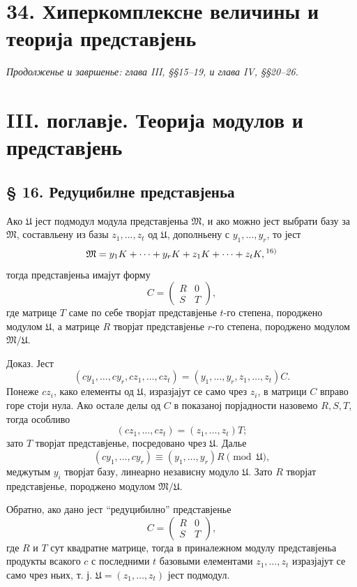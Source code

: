 ﻿\documentclass[11pt]{article}
\providecommand{\mM}{\mathfrak{M}}
\providecommand{\mU}{\mathfrak{U}}
\begin{document}
\section*{34. Хиперкомплексне величины и теорија представјень}
\emph{Продолженье и завршенье: глава III, §§15--19, и глава IV, §§20--26.}

\section*{III. поглавје. Теорија модулов и представјень}

\subsection*{§ 16. Редуцибилне представјеньа}

Ако $\mU$ јест подмодул модула представјеньа $\mM$, и ако можно јест выбрати базу за $\mM$, составльену из базы $z_1,\ldots,z_t$ од $\mU$, дополньену с $y_1,\ldots,y_r$, то јест
\[
        \mM=y_1K+\cdots+y_rK+z_1K+\cdots+z_tK,\textsuperscript{16)}
\]
тогда представјеньа имајут форму
\[
        C=\begin{pmatrix}R&0\\ S&T\end{pmatrix},
\]
где матрице $T$ саме по себе творјат представјенье $t$-го степена, породжено модулом $\mU$, а матрице $R$ творјат представјенье $r$-го степена, породжено модулом $\mM/\mU$.

Доказ. Јест
\[
        (cy_1,\ldots,cy_r,cz_1,\ldots,cz_t)
        =(y_1,\ldots,y_r,z_1,\ldots,z_t)C.
\]
Понеже $cz_i$, како елементы од $\mU$, изразјајут се само чрез $z_i$, в матрици $C$ вправо горе стоји нула. Ако остале делы од $C$ в показаној порјадности назовемо $R,S,T$, тогда особливо
\[
        (cz_1,\ldots,cz_t)=(z_1,\ldots,z_t)T;
\]
зато $T$ творјат представјенье, посредовано чрез $\mU$. Далье
\[
        (cy_1,\ldots,cy_r)\equiv (y_1,\ldots,y_r)R\pmod{\mU},
\]
меджутым $y_i$ творјат базу, линеарно независну модуло $\mU$. Зато $R$ творјат представјенье, породжено модулом $\mM/\mU$.

Обратно, ако дано јест ``редуцибилно'' представјенье
\[
        C=\begin{pmatrix}R&0\\ S&T\end{pmatrix},
\]
где $R$ и $T$ сут квадратне матрице, тогда в приналежном модулу представјеньа продукты всакого $c$ с последними $t$ базовыми елементами $z_1,\ldots,z_t$ изразјајут се само чрез ньих, т. ј. $\mU=(z_1,\ldots,z_t)$ јест подмодул.
\end{document}
